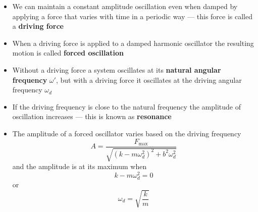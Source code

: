 \documentclass{article}
\begin{document}
\begin{itemize}
    \item We can maintain a constant amplitude oscillation even when damped by applying a force that varies with time in a periodic way — this force is called a \textbf{driving force}

    \item When a driving force is applied to a damped harmonic oscillator the resulting motion is called \textbf{forced oscillation}

    \item Without a driving force a system oscillates at its \textbf{natural angular frequency} $\omega'$, but with a driving force it oscillates at the driving angular frequency $\omega_d$

    \item If the driving frequency is close to the natural frequency the amplitude of oscillation increases — this is known as \textbf{resonance}

    \item The amplitude of a forced oscillator varies based on the driving frequency \[A = \frac{F_\textrm{max}}{\sqrt{(k - m\omega_d^2)^2 + b^2\omega_d^2}}\] and the amplitude is at its maximum when \[k - m\omega_d^2 = 0\] or \[\omega_d = \sqrt{\frac{k}{m}}\]
\end{itemize}
\end{document}

